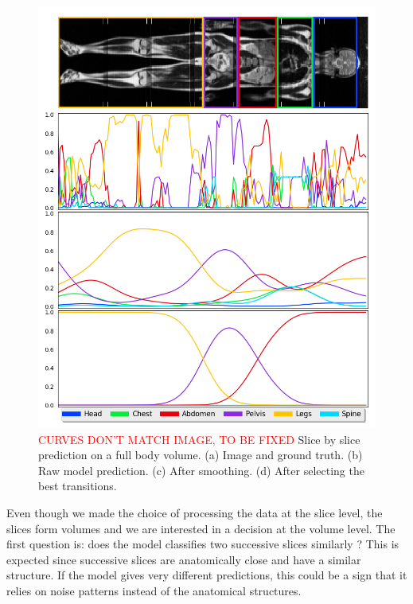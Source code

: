 \begin{figure}[htbp]
	\centering
	\includegraphics[width=\linewidth]{img_hyperopt/fullbody}
	\caption{\textcolor{red}{CURVES DON'T MATCH IMAGE, TO BE FIXED} Slice by slice prediction on a full body volume. (a) Image and ground truth. (b) Raw model prediction. (c) After smoothing. (d) After selecting the best transitions.}
	\label{fig:full_body}
\end{figure}

Even though we made the choice of processing the data at the slice level, the slices form volumes and we are interested in a decision at the volume level. The first question is: does the model classifies two successive slices similarly ? This is expected since successive slices are anatomically close and have a similar structure. If the model gives very different predictions, this could be a sign that it relies on noise patterns instead of the anatomical structures.

